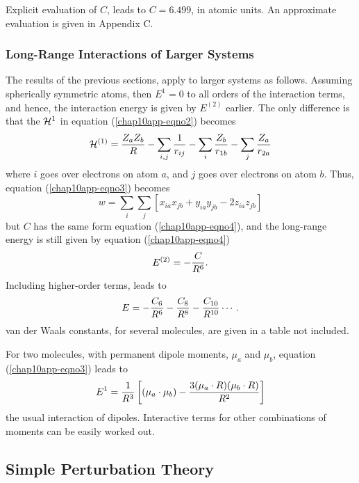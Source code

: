 Explicit evaluation of $C$, leads to $C = 6.499$, 
in atomic units.  An approximate evaluation is given in Appendix C.

\subsubsection{Long-Range Interactions of Larger Systems}

The results of the previous sections, apply to larger systems as
follows.  Assuming spherically symmetric atoms, then $E^1 = 0$ 
to all orders of the interaction terms, and hence, the interaction 
energy is given by $E^{(2)}$ earlier.  The only difference is that 
the ${\cal H}^1$ in equation (\ref{chap10app-eqno2}) becomes
\begin{equation}
{\cal H}^{(1)} = {Z_a Z_b \over R} - \sum_{i,j} {1 \over r_{ij}} - 
\sum_{i} {Z_b \over r_{1b}} - \sum_{j} {Z_a \over r_{2a}}
\end{equation}
where $i$ goes over electrons on atom $a$, and $j$ goes over electrons 
on atom $b$.  Thus, equation (\ref{chap10app-eqno3}) becomes
\begin{equation}
w = \sum_{i} \sum_{j} \left[ x_{ia} x_{jb} + y_{ia} y_{jb} - 2 z_{ia} 
z_{jb} \right]
\end{equation}
but $C$ has the same form equation (\ref{chap10app-eqno4}), and the
long-range energy is still given by equation (\ref{chap10app-eqno4})
\begin{equation}
E^{(2)} = - {C \over R^6} .
\end{equation}
Including higher-order terms, leads to
\begin{equation}
E = - {C_6 \over R^6} - {C_8 \over R^8} - {C_{10} \over R^{10}} \cdots .
\end{equation}
van der Waals constants, for several molecules, are given in a table 
not included.

For two molecules, with permanent dipole moments, $\mu_a$ and $\mu_b$, 
equation (\ref{chap10app-eqno3}) leads to
\begin{equation}
E^1 = {1 \over R^3} \left[ \left( \mu_a \cdot \mu_b \right) - 
{3(\mu_a \cdot R)(\mu_b \cdot R) \over R^2} \right]
\end{equation}
the usual interaction of dipoles.  Interactive terms for other 
combinations of moments can be easily worked out.

\subsection{Simple Perturbation Theory}
\label{chap10-app-b}

